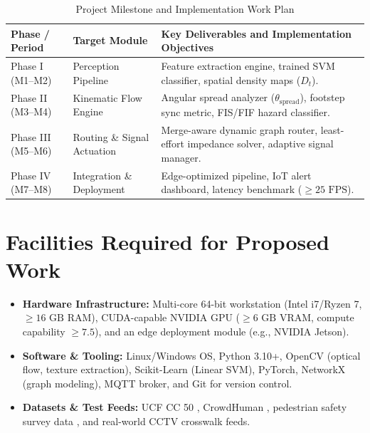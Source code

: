 \documentclass[12pt,a4paper]{article}
\begin{document}
\begin{table}[htbp]
\centering
\caption{Project Milestone and Implementation Work Plan}
\label{tab:work_plan}
\fontsize{10pt}{12pt}\selectfont
\begin{tabular}{@{}llp{3.1in}@{}}
\toprule
\textbf{Phase / Period} & \textbf{Target Module} & \textbf{Key Deliverables and Implementation Objectives} \\ \midrule
Phase I (M1--M2) & Perception Pipeline & Feature extraction engine, trained SVM classifier, spatial density maps ($D_t$). \\
Phase II (M3--M4) & Kinematic Flow Engine & Angular spread analyzer ($\theta_{\text{spread}}$), footstep sync metric, FIS/FIF hazard classifier. \\
Phase III (M5--M6) & Routing \& Signal Actuation & Merge-aware dynamic graph router, least-effort impedance solver, adaptive signal manager. \\
Phase IV (M7--M8) & Integration \& Deployment & Edge-optimized pipeline, IoT alert dashboard, latency benchmark ($\ge 25\text{ FPS}$). \\ \bottomrule
\end{tabular}
\end{table}

\section{Facilities Required for Proposed Work}
\begin{itemize}
    \item \textbf{Hardware Infrastructure:} Multi-core 64-bit workstation (Intel i7/Ryzen 7, $\ge 16\text{ GB}$ RAM), CUDA-capable NVIDIA GPU ($\ge 6\text{ GB}$ VRAM, compute capability $\ge 7.5$), and an edge deployment module (e.g., NVIDIA Jetson).
    \item \textbf{Software \& Tooling:} Linux/Windows OS, Python 3.10+, OpenCV (optical flow, texture extraction), Scikit-Learn (Linear SVM), PyTorch, NetworkX (graph modeling), MQTT broker, and Git for version control.
    \item \textbf{Datasets \& Test Feeds:} UCF CC 50 \cite{basalamah2020pedestrian}, CrowdHuman \cite{shao2018crowdhuman}, pedestrian safety survey data \cite{maitra2024kolkata}, and real-world CCTV crosswalk feeds.
\end{itemize}
\end{document}
